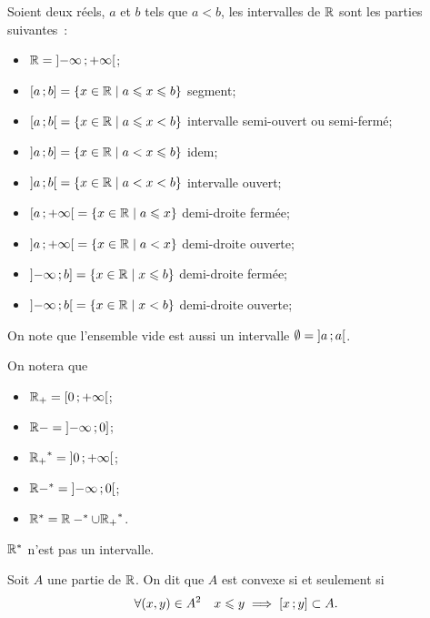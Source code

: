 \begin{defdef}
  Soient deux réels, \(a\) et \(b\) tels que \(a<b\), les intervalles de \(\mathbb{R}\) sont les parties suivantes~:
  \begin{itemize}
  \item \(\mathbb{R}=\left] -\infty \, ;  +\infty \right[\);
  \item \(\left[ a \, ;  b \right]=\left\{x \in \mathbb{R}\mathrel{}\middle|\mathrel{}a\leqslant x \leqslant b\right\}\) segment;
  \item \(\left[ a \, ;  b \right[=\left\{x \in \mathbb{R}\mathrel{}\middle|\mathrel{}a\leqslant x < b\right\}\) intervalle semi-ouvert ou semi-fermé;
  \item \(\left] a \, ;  b \right]=\left\{x \in \mathbb{R}\mathrel{}\middle|\mathrel{}a< x \leqslant b\right\}\) idem;
  \item \(\left] a \, ;  b \right[=\left\{x \in \mathbb{R}\mathrel{}\middle|\mathrel{}a< x < b\right\}\) intervalle ouvert;
  \item \(\left[ a \, ;  +\infty \right[=\left\{x \in \mathbb{R}\mathrel{}\middle|\mathrel{}a\leqslant x\right\}\) demi-droite fermée;
  \item \(\left] a \, ;  +\infty \right[=\left\{x \in \mathbb{R}\mathrel{}\middle|\mathrel{}a< x\right\}\) demi-droite ouverte;
  \item \(\left] -\infty \, ;  b \right]=\left\{x \in \mathbb{R}\mathrel{}\middle|\mathrel{}x \leqslant b\right\}\) demi-droite fermée;
  \item \(\left] -\infty \, ;  b \right[=\left\{x \in \mathbb{R}\mathrel{}\middle|\mathrel{}x <b\right\}\) demi-droite ouverte;
  \end{itemize}
\end{defdef}
On note que l'ensemble vide est aussi un intervalle \(\emptyset=\left] a \, ;  a \right[\).
\begin{defdef}
  On notera que
  \begin{itemize}
  \item \(\mathbb{R}_{+}=\left[ 0 \, ;  +\infty \right[\);
  \item \(\mathbb{R}-=\left] -\infty \, ;  0 \right]\);
  \item \({\mathbb{R}_{+}}^*=\left] 0 \, ;  +\infty \right[\);
  \item \(\mathbb{R}-^*=\left] -\infty \, ;  0 \right[\);
  \item \(\mathbb{R}^*=\mathbb{R}-^* \cup {\mathbb{R}_{+}}^*\).
  \end{itemize}
  \(\mathbb{R}^*\) n'est pas un intervalle.
\end{defdef}
\begin{defdef}
  Soit \(A\) une partie de \(\mathbb{R}\). On dit que \(A\) est convexe si et seulement si
  \begin{equation}
    \forall (x,y) \in A^2 \quad x\leqslant y \implies \left[ x \, ;  y \right]\subset A.
  \end{equation}
\end{defdef}
